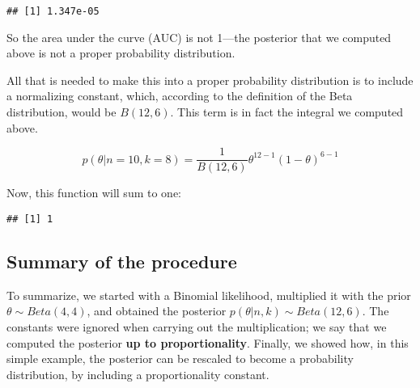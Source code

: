 \documentclass[12pt,]{krantz}
\newenvironment{Shaded}{\begin{snugshade}}{\end{snugshade}}
\newcommand{\ControlFlowTok}[1]{\textcolor[rgb]{0.13,0.29,0.53}{\textbf{#1}}}
\newcommand{\DataTypeTok}[1]{\textcolor[rgb]{0.13,0.29,0.53}{#1}}
\newcommand{\DecValTok}[1]{\textcolor[rgb]{0.00,0.00,0.81}{#1}}
\newcommand{\KeywordTok}[1]{\textcolor[rgb]{0.13,0.29,0.53}{\textbf{#1}}}
\newcommand{\NormalTok}[1]{#1}
\newcommand{\OperatorTok}[1]{\textcolor[rgb]{0.81,0.36,0.00}{\textbf{#1}}}
\newcommand{\StringTok}[1]{\textcolor[rgb]{0.31,0.60,0.02}{#1}}
\begin{document}
\begin{verbatim}
## [1] 1.347e-05
\end{verbatim}

So the area under the curve (AUC) is not 1---the posterior that we computed above is not a proper probability distribution.

All that is needed to make this into a proper probability distribution is to include a normalizing constant, which, according to the definition of the Beta distribution, would be \(B(12,6)\). This term is in fact the integral we computed above.

\begin{equation}
p(\theta|n=10,k=8) = \frac{1}{B(12,6)} \theta^{12-1} (1-\theta)^{6-1} 
\end{equation}

Now, this function will sum to one:

\begin{Shaded}
\end{Shaded}

\begin{verbatim}
## [1] 1
\end{verbatim}

\hypertarget{summary-of-the-procedure}{%
\subsection{Summary of the procedure}\label{summary-of-the-procedure}}

To summarize, we started with a Binomial likelihood, multiplied it with the prior \(\theta \sim Beta(4,4)\), and obtained the posterior \(p(\theta|n,k) \sim Beta(12,6)\). The constants were ignored when carrying out the multiplication; we say that we computed the posterior \textbf{up to proportionality}. Finally, we showed how, in this simple example, the posterior can be rescaled to become a probability distribution, by including a proportionality constant.
\end{document}
